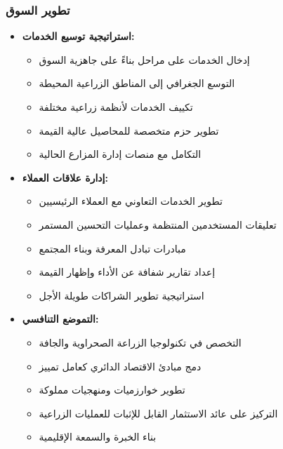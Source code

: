 \subsubsection{تطوير السوق}
\begin{itemize}
    \item \textbf{استراتيجية توسيع الخدمات:}
    \begin{itemize}
        \item إدخال الخدمات على مراحل بناءً على جاهزية السوق
        \item التوسع الجغرافي إلى المناطق الزراعية المحيطة
        \item تكييف الخدمات لأنظمة زراعية مختلفة
        \item تطوير حزم متخصصة للمحاصيل عالية القيمة
        \item التكامل مع منصات إدارة المزارع الحالية
    \end{itemize}
    
    \item \textbf{إدارة علاقات العملاء:}
    \begin{itemize}
        \item تطوير الخدمات التعاوني مع العملاء الرئيسيين
        \item تعليقات المستخدمين المنتظمة وعمليات التحسين المستمر
        \item مبادرات تبادل المعرفة وبناء المجتمع
        \item إعداد تقارير شفافة عن الأداء وإظهار القيمة
        \item استراتيجية تطوير الشراكات طويلة الأجل
    \end{itemize}
    
    \item \textbf{التموضع التنافسي:}
    \begin{itemize}
        \item التخصص في تكنولوجيا الزراعة الصحراوية والجافة
        \item دمج مبادئ الاقتصاد الدائري كعامل تمييز
        \item تطوير خوارزميات ومنهجيات مملوكة
        \item التركيز على عائد الاستثمار القابل للإثبات للعمليات الزراعية
        \item بناء الخبرة والسمعة الإقليمية
    \end{itemize}
\end{itemize}

